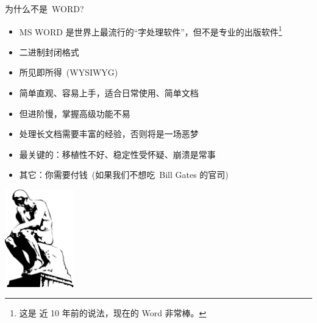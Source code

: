 \documentclass[dvipsnames, svgnames,
               mode=present, paper=screen,
               size=9pt, style=husky]{powerdot}
\begin{document}
\begin{slide}{为什么不是~WORD?}
  \begin{itemize}
  \item MS WORD 是世界上最流行的“字处理软件”，但不是专业的出版软件\footnote{这是
      近 10 年前的说法，现在的 Word 非常棒。}
  \item 二进制封闭格式
  \item 所见即所得~(WYSIWYG)
  \item 简单直观、容易上手，适合日常使用、简单文档
  \item 但进阶慢，掌握高级功能不易
  \item 处理长文档需要丰富的经验，否则将是一场恶梦
  \item 最关键的：移植性不好、稳定性受怀疑、崩溃是常事
  \item 其它：你需要付钱~(如果我们不想吃~Bill Gates 的官司)
  \end{itemize}
  \bigskip
\centering
\includegraphics[width=3cm]{thinker.png}
\end{slide}
\end{document}
